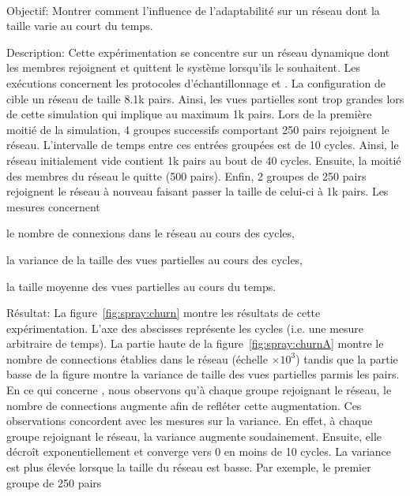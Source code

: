 \ \\

\begin{asparadesc}
\item [Objectif:] Montrer comment l'influence de l'adaptabilité sur un réseau
  dont la taille varie au court du temps.
\item [Description:] Cette expérimentation se concentre sur un réseau dynamique
  dont les membres rejoignent et quittent le système lorsqu'ils le
  souhaitent. Les exécutions concernent les protocoles d'échantillonnage \CYCLON
  et \SPRAY. La configuration de \CYCLON cible un réseau de taille 8.1k
  pairs. Ainsi, les vues partielles sont trop grandes lors de cette simulation
  qui implique au maximum 1k pairs. Lors de la première moitié de la simulation,
  4 groupes successifs comportant 250 pairs rejoignent le réseau. L'intervalle
  de temps entre ces entrées groupées est de 10 cycles. Ainsi, le réseau
  initialement vide contient 1k pairs au bout de 40 cycles. Ensuite, la moitié
  des membres du réseau le quitte (500 pairs). Enfin, 2 groupes de 250 pairs
  rejoignent le réseau à nouveau faisant passer la taille de celui-ci à 1k
  pairs. Les mesures concernent
  \begin{inparaenum}[(i)]
  \item le nombre de connexions dans le réseau au cours des cycles,
  \item la variance de la taille des vues partielles au cours des cycles,
  \item la taille moyenne des vues partielles au cours du temps.
  \end{inparaenum}
\item [Résultat:] La figure~\ref{fig:spray:churn} montre les résultats de cette
  expérimentation. L'axe des abscisses représente les cycles (i.e. une mesure
  arbitraire de temps). La partie haute de la figure~\ref{fig:spray:churnA}
  montre le nombre de connections établies dans le réseau (échelle
  $\times 10^3$) tandis que la partie basse de la figure montre la variance de
  taille des vues partielles parmis les pairs. En ce qui concerne \SPRAY, nous
  observons qu'à chaque groupe rejoignant le réseau, le nombre de connections
  augmente afin de refléter cette augmentation. Ces observations concordent avec
  les mesures sur la variance. En effet, à chaque groupe rejoignant le réseau,
  la variance augmente soudainement. Ensuite, elle décroît exponentiellement et
  converge vers 0 en moins de 10 cycles. La variance est plus élevée lorsque la
  taille du réseau est basse. Par exemple, le premier groupe de 250 pairs

\end{asparadesc}
